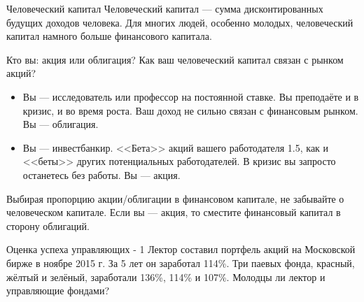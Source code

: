 \documentclass{beamer}
\begin{document}
\begin{frame}{Человеческий капитал}
\justify
Человеческий капитал --- сумма дисконтированных будущих доходов человека. Для многих людей, особенно молодых, человеческий капитал намного больше финансового капитала.

\justify
Кто вы: акция или облигация? Как ваш человеческий капитал связан с рынком акций?
\begin{itemize}
\justifying
\item Вы --- исследователь или профессор на постоянной ставке. Вы преподаёте и в кризис, и во время роста. Ваш доход не сильно связан с финансовым рынком. Вы --- облигация.
\item Вы --- инвестбанкир. <<Бета>> акций вашего работодателя 1.5, как и <<беты>> других потенциальных работодателей. В кризис вы запросто останетесь без работы. Вы --- акция.
\end{itemize}
Выбирая пропорцию акции/облигации в финансовом капитале, не забывайте о человеческом капитале. Если вы --- акция, то сместите финансовый капитал в сторону облигаций.
\end{frame}



\begin{frame}{Оценка успеха управляющих - 1}
\justify
Лектор составил портфель акций на Московской бирже в ноябре 2015 г. За 5 лет он заработал 114\%. Три паевых фонда, красный, жёлтый и зелёный, заработали 136\%, 114\% и 107\%. Молодцы ли лектор и управляющие фондами?

\vspace{\baselineskip}
\end{frame}
\end{document}
